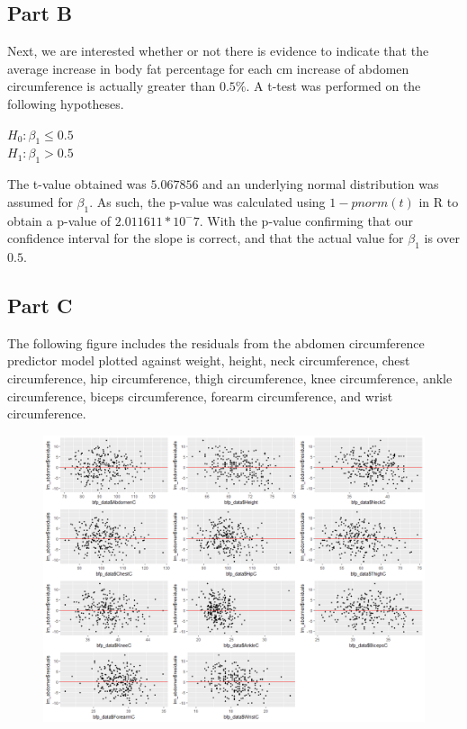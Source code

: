 \documentclass[a4paper, 11pt]{article}
\begin{document}
\subsection*{Part B}
Next, we are interested whether or not there is evidence to indicate that the average increase in body fat percentage for each cm increase of abdomen circumference is actually greater than $0.5\%$. A t-test was performed on the following hypotheses.
\begin{center}
	$H_0: \beta_1 \leq 0.5$\\
	$H_1: \beta_1 > 0.5$
\end{center}

The t-value obtained was $5.067856$ and an underlying normal distribution was assumed for $\beta_1$. As such, the p-value was calculated using $1-pnorm(t)$ in R to obtain a p-value of $2.011611*10^-7$. With the p-value confirming that our confidence interval for the slope is correct, and that the actual value for $\beta_1$ is over $0.5$.

\subsection*{Part C}
The following figure includes the residuals from the abdomen circumference predictor model plotted against weight, height, neck circumference, chest circumference, hip circumference, thigh circumference, knee circumference, ankle circumference, biceps circumference, forearm circumference, and wrist circumference.
\begin{figure}[H]
	\centering
	\includegraphics[width=\textwidth]{plots.png}
\end{figure}
\end{document}
